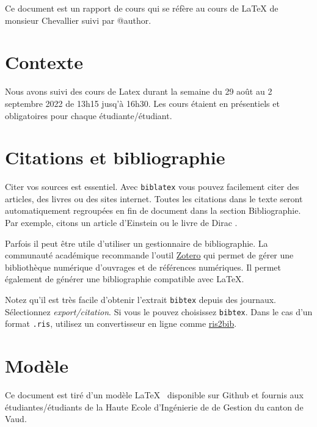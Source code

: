 Ce document est un rapport de cours qui se réfère au cours de LaTeX de monsieur Chevallier suivi par @author.
\section{Contexte}
Nous avons suivi des cours de Latex durant la semaine du 29 août au 2 septembre 2022 de 13h15 jusq'à 16h30. Les cours étaient en présentiels et obligatoires pour chaque étudiante/étudiant.
\section{Citations et bibliographie}
Citer vos sources est essentiel. Avec \texttt{biblatex} vous pouvez facilement citer des articles, des livres ou des sites internet. Toutes les citations dans le texte seront automatiquement regroupées en fin de document dans la section \guillemotleft Bibliographie\guillemotright. Par exemple, citons un article d'Einstein \cite{einstein} ou le livre de Dirac \cite{dirac}.

Parfois il peut être utile d'utiliser un gestionnaire de bibliographie. La communauté académique recommande l'outil \href{https://www.zotero.org/}{Zotero} qui permet de gérer une bibliothèque numérique d'ouvrages et de références numériques. Il permet également de générer une bibliographie compatible avec \LaTeX.

Notez qu'il est très facile d'obtenir l'extrait \texttt{bibtex} depuis des journaux. Sélectionnez \emph{export/citation}. Si vous le pouvez choisissez \texttt{bibtex}. Dans le cas d'un format \texttt{.ris}, utilisez un convertisseur en ligne comme \href{http://www.bruot.org/ris2bib/}{ris2bib}.

\section{Modèle}
Ce document est tiré d'un modèle \LaTeX~ disponible sur Github  et fournis aux étudiantes/étudiants de la Haute Ecole d'Ingénierie de de Gestion du canton de Vaud.
